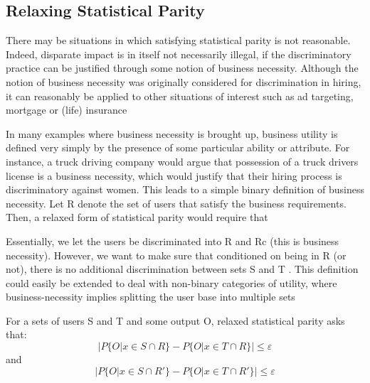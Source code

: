 \subsection{Relaxing Statistical Parity}
There may be situations in which satisfying statistical parity is not reasonable. Indeed, disparate
impact is in itself not necessarily illegal, if the discriminatory practice can be justified
through some notion of business necessity. Although the notion of business necessity was
originally considered for discrimination in hiring, it can reasonably be applied to other situations
of interest such as ad targeting, mortgage or (life) insurance

In many examples where business necessity is brought up, business utility is defined very
simply by the presence of some particular ability or attribute. For instance, a truck
driving company would argue that possession of a truck drivers license is a business necessity,
which would justify that their hiring process is discriminatory against women.
This leads to a simple binary definition of business necessity. Let R denote the set of
users that satisfy the business requirements. Then, a relaxed form of statistical parity would
require that

Essentially, we let the users be discriminated into R and Rc (this is business necessity).
However, we want to make sure that conditioned on being in R (or not), there is no additional
discrimination between sets S and T .
This definition could easily be extended to deal with non-binary categories of utility,
where business-necessity implies splitting the user base into multiple sets



For a sets of users S and T and some output O, relaxed statistical parity asks that:
\begin{equation}
|P\{O | x \in S \cap R\} - P\{O | x \in T \cap R\}| \le \varepsilon
\label{eq:RelaxedStatisticalParityA}
\end{equation}
and
\begin{equation}
|P\{O | x \in S \cap R'\} - P\{O | x \in T \cap R'\}| \le \varepsilon
\label{eq:RelaxedStatisticalParityB}
\end{equation}



